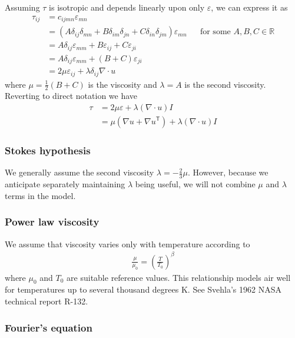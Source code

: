 \documentclass[letterpaper,11pt,nointlimits]{amsart}
\newcommand{\trans}[1]{{#1}^{\ensuremath{\mathsf{T}}}}
\begin{document}
Assuming $\tau$ is isotropic and depends linearly upon only $\varepsilon$,
we can express it as
\begin{align}
\tau_{ij} 
  &= c_{ijmn} \varepsilon_{mn}
  \\
  &= \left( A \delta_{ij} \delta_{mn} 
          + B \delta_{im} \delta_{jn} 
          + C \delta_{in} \delta_{jm}
     \right) \varepsilon_{mn}
  &
  &\text{for some }A, B, C\in\mathbb{R}
  \\
  &= A \delta_{ij} \varepsilon_{mm} + B\varepsilon_{ij} + C\varepsilon_{ji}
  \\
  &= A \delta_{ij} \varepsilon_{mm} + \left( B+C \right)\varepsilon_{ji}
  \\
  &= 2 \mu \varepsilon_{ij} + \lambda\delta_{ij}\nabla\cdot{}u
\end{align}
where $\mu=\frac{1}{2}\left( B + C \right)$ is the viscosity
and $\lambda=A$ is the second viscosity.
Reverting to direct notation we have
\begin{align}
\tau 
  &= 2 \mu \varepsilon + \lambda \left( \nabla\cdot{}u \right) I
  \\
\label{eq:taunewt}
&=   \mu \left( \nabla{}u + \trans{\nabla{}u} \right) 
   + \lambda \left( \nabla\cdot{}u \right) I
\end{align}

\subsubsection{Stokes hypothesis}

We generally assume the second viscosity $\lambda=-\frac{2}{3}\mu$.
However, because we anticipate separately maintaining $\lambda$ being
useful, we will not combine $\mu$ and $\lambda$ terms in the model.

\subsubsection{Power law viscosity}

We assume that viscosity varies only with temperature according to
\begin{align}
  \label{eq:powerlawviscosity}
  \frac{\mu}{\mu_{0}}=\left(\frac{T}{T_{0}}\right)^{\beta}
\end{align}
where $\mu_{0}$ and $T_{0}$ are suitable reference values.  This
relationship models air well for temperatures up to several thousand
degrees K.  See Svehla's 1962 NASA technical report R-132.

\subsubsection{Fourier's equation}
\end{document}
